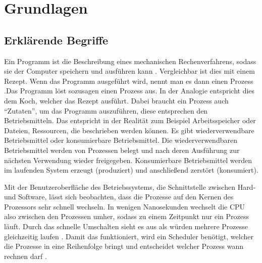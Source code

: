 \chapter{Grundlagen}
\label{grundlagen}
\section{Erklärende Begriffe}
\label{sec:begriffe}
Ein Programm ist die Beschreibung eines mechanischen Rechenverfahrens, sodass sie der Computer speichern und ausführen kann \parencite[vgl.][14]{rechenberg2000}. Vergleichbar ist dies mit einem Rezept. Wenn das Programm ausgeführt wird, nennt man es dann einen Prozess \parencite[vgl.][S.71]{tanenbaum2016}.Das Programm löst sozusagen einen Prozess aus. In der Analogie entspricht dies dem Koch, welcher das Rezept ausführt.  Dabei braucht ein Prozess auch “Zutaten”, um das Programm auszuführen, diese entsprechen den Betriebsmitteln. Das entspricht in der Realität zum Beispiel Arbeitsspeicher oder Dateien, Ressourcen, die beschrieben werden können. Es gibt wiederverwendbare Betriebsmittel oder konsumierbare Betriebsmittel. Die wiederverwendbaren Betriebsmittel werden von Prozessen belegt und nach deren Ausführung zur nächsten Verwendung  wieder freigegeben. Konsumierbare Betriebsmittel werden im laufenden System erzeugt (produziert) und anschließend zerstört (konsumiert).


Mit der Benutzeroberfläche des Betriebssystems, die Schnittstelle zwischen Hard- und Software, lässt sich beobachten, dass die Prozesse auf den Kernen des Prozessors sehr schnell wechseln. In wenigen Nanosekunden wechselt die CPU also zwischen den Prozessen umher, sodass zu einem Zeitpunkt nur ein Prozess läuft. Durch das schnelle Umschalten sieht es aus als würden mehrere Prozesse gleichzeitig laufen \parencite[vgl.][S.466]{sommer2002}. Damit  das funktioniert, wird ein Scheduler benötigt, welcher die Prozesse in eine Reihenfolge bringt und entscheidet welcher Prozess wann rechnen darf \parencite[vgl.][S.199]{tanenbaum2016}.

